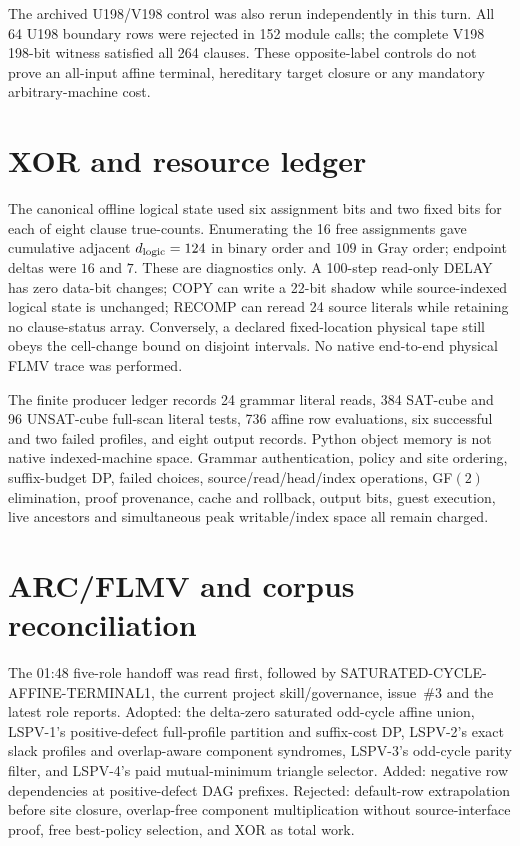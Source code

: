 \documentclass[11pt]{article}
\begin{document}
The archived U198/V198 control was also rerun independently in this turn.  All 64 U198 boundary rows were rejected in 152 module calls; the complete V198 198-bit witness satisfied all 264 clauses.  These opposite-label controls do not prove an all-input affine terminal, hereditary target closure or any mandatory arbitrary-machine cost.

\section{XOR and resource ledger}
The canonical offline logical state used six assignment bits and two fixed bits for each of eight clause true-counts.  Enumerating the 16 free assignments gave cumulative adjacent $d_{\rm logic}=124$ in binary order and $109$ in Gray order; endpoint deltas were $16$ and $7$.  These are diagnostics only.  A 100-step read-only DELAY has zero data-bit changes; COPY can write a 22-bit shadow while source-indexed logical state is unchanged; RECOMP can reread 24 source literals while retaining no clause-status array.  Conversely, a declared fixed-location physical tape still obeys the cell-change bound on disjoint intervals.  No native end-to-end physical FLMV trace was performed.

The finite producer ledger records 24 grammar literal reads, 384 SAT-cube and 96 UNSAT-cube full-scan literal tests, 736 affine row evaluations, six successful and two failed profiles, and eight output records.  Python object memory is not native indexed-machine space.  Grammar authentication, policy and site ordering, suffix-budget DP, failed choices, source/read/head/index operations, GF$(2)$ elimination, proof provenance, cache and rollback, output bits, guest execution, live ancestors and simultaneous peak writable/index space all remain charged.

\section{ARC/FLMV and corpus reconciliation}
The 01:48 five-role handoff was read first, followed by SATURATED-CYCLE-AFFINE-TERMINAL1, the current project skill/governance, issue~\#3 and the latest role reports.  Adopted: the delta-zero saturated odd-cycle affine union, LSPV-1's positive-defect full-profile partition and suffix-cost DP, LSPV-2's exact slack profiles and overlap-aware component syndromes, LSPV-3's odd-cycle parity filter, and LSPV-4's paid mutual-minimum triangle selector.  Added: negative row dependencies at positive-defect DAG prefixes.  Rejected: default-row extrapolation before site closure, overlap-free component multiplication without source-interface proof, free best-policy selection, and XOR as total work.
\end{document}
